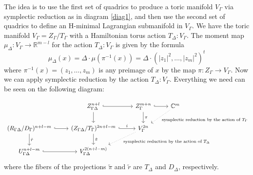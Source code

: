 \documentclass[jsg]{IP_v1_forauthors}
\theoremstyle{definition}
\numberwithin{equation}{section}
\begin{document}
The idea is to use the first set of quadrics to produce a toric manifold $V_\Gamma$ via symplectic reduction as in diagram \eqref{diag1}, and
then use the second set of quadrics to define an H-minimal Lagrangian submanifold in $V_\Gamma$. We have the toric manifold $V_\Gamma=Z_\Gamma/T_\Gamma$ with a Hamiltonian torus action $T_\Delta \colon V_\Gamma$. The moment map $\mu_\Delta \colon V_\Gamma \rightarrow {\mathbb R}^{m-l}$ for the action $T_\Delta : V_\Gamma$ is given by the formula  
\begin{equation}
\mu_\Delta(x)=\Delta \cdot \mu ( \pi^{-1}(x))= \Delta \cdot (|z_1|^2,\ldots,|z_m|^2)^t
\end{equation}
where $\pi^{-1}(x)=(z_1,\ldots,z_m)$ is any preimage of $x$ by the map $\pi \colon Z_\Gamma \rightarrow V_\Gamma$. Now we can apply symplectic reduction by the action $T_\Delta \colon V_\Gamma$. Everything we need can be seen on the following diagram:

\begin{equation}
\begin{tikzcd}
  & Z_{\Gamma \Delta}^{n+l} \arrow[hookrightarrow]{r} \arrow[rightarrow]{d}
  & Z_{\Gamma}^{m+n} \arrow[hookrightarrow]{r} \arrow[rightarrow]{d}{\pi}
  & {\mathbb C}^{m} \arrow[dotted]{dl}{\text{symplectic reduction by the action of $T_\Gamma$}}\\
(R_{\Gamma \Delta}/D_\Gamma)^{n+l-m} \arrow[hookrightarrow]{r} \arrow[rightarrow]{d}{\tilde{r}}
  & (Z_{\Gamma \Delta}/T_\Gamma)^{2n+l-m} \arrow[hookrightarrow]{r}{i}\arrow[rightarrow]{d}{\tilde{\pi}}
  & V_\Gamma^{2n} \arrow[dotted]{dl}{\text{symplectic reduction by the action of $T_\Delta$}}\\
U_{\Gamma \Delta}^{n+l-m} \arrow[hookrightarrow]{r}
  & V_{\Gamma \Delta}^{2(n+l-m)}
\end{tikzcd}
\end{equation}
where the fibers of the projections $\tilde{\pi}$ and $\tilde{r}$ are $T_\Delta$ and $D_\Delta$, respectively.
\end{document}
